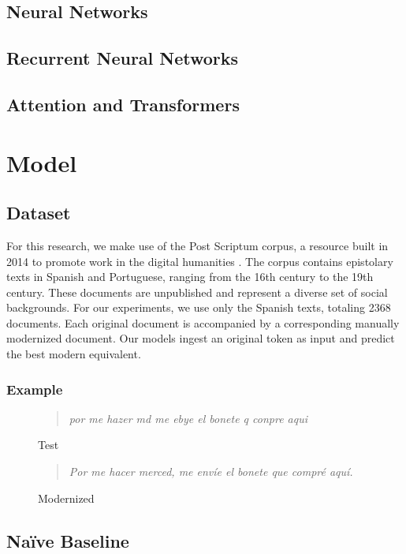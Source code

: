 \documentclass[11pt,a4paper]{article}
\begin{document}
\subsection{Neural Networks}
\subsection{Recurrent Neural Networks}
\subsection {Attention and Transformers}

\section{Model}
\subsection{Dataset}
For this research, we make use of the Post Scriptum corpus, a resource built in 2014 to promote work in the digital humanities \cite{vaamonde_post_2014}. The corpus contains epistolary texts in Spanish and Portuguese, ranging from the 16th century to the 19th century. These documents are unpublished and  represent a diverse set of social backgrounds. For our experiments, we use only the Spanish texts, totaling 2368 documents. Each original document is accompanied by a corresponding manually modernized document. Our models ingest an original token as input and predict the best modern equivalent.
\subsubsection{Example}
\begin{figure}[h]
\begin{quotation}
\noindent \textit{por me hazer md me ebye el bonete q conpre aqui}
\caption{Test}
\end{quotation}
\end{figure}
\begin{figure}[h]
\begin{quote}
\textit{Por me hacer merced, me envíe el bonete que compré aquí.}
\caption{Modernized}
\end{quote}
\end{figure}
\subsection{Na\"ive Baseline}
\end{document}

